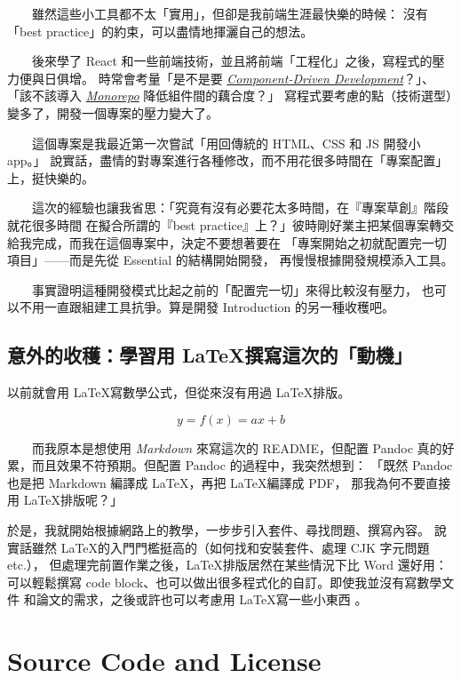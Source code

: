 \documentclass[12pt]{article}
\begin{document}
  　　雖然這些小工具都不太「實用」，但卻是我前端生涯最快樂的時候：
  沒有「best practice」的約束，可以盡情地揮灑自己的想法。

  　　後來學了 React 和一些前端技術，並且將前端「工程化」之後，寫程式的壓力便與日俱增。
  時常會考量「是不是要 \href{https://www.componentdriven.org}{\textit{Component-Driven Development}}？」、
  「該不該導入 \href{https://nx.dev}{\textit{Monorepo}} 降低組件間的藕合度？」
  寫程式要考慮的點（技術選型）變多了，開發一個專案的壓力變大了。

  　　這個專案是我最近第一次嘗試「用回傳統的 HTML、CSS 和 JS 開發小 app。」
  說實話，盡情的對專案進行各種修改，而不用花很多時間在「專案配置」上，挺快樂的。

  　　這次的經驗也讓我省思：「究竟有沒有必要花太多時間，在『專案草創』階段就花很多時間
  在擬合所謂的『best practice』上？」彼時剛好業主把某個專案轉交給我完成，而我在這個專案中，決定不要想著要在
  「專案開始之初就配置完一切項目」——而是先從 Essential 的結構開始開發，
  再慢慢根據開發規模添入工具。

  　　事實證明這種開發模式比起之前的「配置完一切」來得比較沒有壓力，
  也可以不用一直跟組建工具抗爭。算是開發 Introduction 的另一種收穫吧。

  \subsection{意外的收穫：學習用 \LaTeX 撰寫這次的「動機」}
  以前就會用 \LaTeX 寫數學公式，但從來沒有用過 \LaTeX 排版。

        $$y = f(x) = ax+b$$

  　　而我原本是想使用 \textit{Markdown} 來寫這次的 README，但配置
  Pandoc 真的好累，而且效果不符預期。但配置 Pandoc 的過程中，我突然想到：
  「既然 Pandoc 也是把 Markdown 編譯成 \LaTeX，再把 \LaTeX 編譯成 PDF，
  那我為何不要直接用 \LaTeX 排版呢？」

  於是，我就開始根據網路上的教學，一步步引入套件、尋找問題、撰寫內容。
  說實話雖然 \LaTeX 的入門門檻挺高的（如何找和安裝套件、處理 CJK 字元問題 etc.），
  但處理完前置作業之後，\LaTeX 排版居然在某些情況下比 Word 還好用：
  可以輕鬆撰寫 code block、也可以做出很多程式化的自訂。即使我並沒有寫數學文件
  和論文的需求，之後或許也可以考慮用 \LaTeX 寫一些小東西 。

  \newpage

  \section{Source Code and License}
\end{document}
